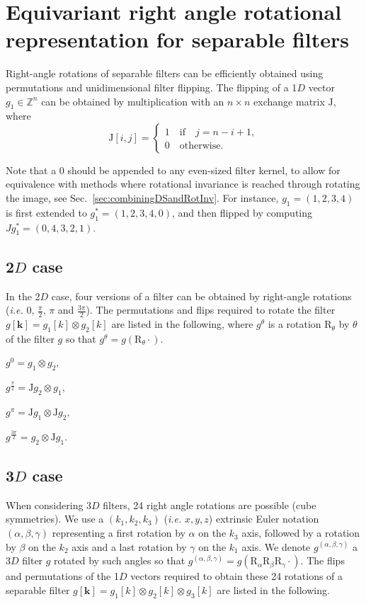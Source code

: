 \documentclass[fleqn,a4paper,oneside,openany]{book}
\begin{document}
\appendix
\chapter{Equivariant right angle rotational representation for separable filters} \label{app:separableConvRightAngleEquivariant}
Right-angle rotations of separable filters can be efficiently obtained using permutations and unidimensional filter flipping.
The flipping of a 1$D$ vector $g_1 \in \mathbb{Z}^n$ can be obtained by multiplication with an $n\times n$ exchange matrix $\mathrm{J}$, where 
$$\mathrm{J}[i,j] = \begin{cases}
1\quad \text{if}\quad j=n-i+1,\\
0\quad \text{otherwise}.
\end{cases}$$

Note that a $0$ should be appended to any even-sized filter kernel, to allow for equivalence with methods where rotational invariance is reached through rotating the image, see Sec.~\ref{sec:combiningDSandRotInv}. For instance, $g_1 = (1,2,3,4)$ is first extended to $g_1^{*}=(1,2,3,4,0)$, and then flipped by computing $Jg_1^{*}=(0,4,3,2,1)$.

\section{2$D$ case}
In the 2$D$ case, four versions of a filter can be obtained by right-angle rotations (\textit{i.e.} $0$, $\frac{\pi}{2}$, $\pi$ and $\frac{3\pi}{2}$). The permutations and flips required to rotate the filter $g[\boldsymbol{k}]= g_{1}[k]\otimes g_{2}[k]$ are listed in the following, where $g^{\theta}$ is a rotation $\mathrm{R}_{\theta}$ by $\theta$  of the filter $g$ so that $g^{\theta}=g(\mathrm{R}_{\theta}\cdot)$.

$g^0= g_{1}\otimes g_{2},$

$g^{\frac{\pi}{2}}= \mathrm{J} g_{2}\otimes g_{1},$

$g^{\pi}= \mathrm{J} g_{1}\otimes \mathrm{J} g_{2},$

$g^{\frac{3\pi}{2}}= g_{2}\otimes \mathrm{J} g_{1}.$


\section{3$D$ case}
When considering 3$D$ filters, 24 right angle rotations are possible (cube symmetries). 
We use a $(k_1,k_2,k_3)$ (\textit{i.e.} $x,y,z$) extrinsic Euler notation $(\alpha,\beta,\gamma)$ representing a first rotation by $\alpha$ on the $k_3$ axis, followed by a rotation by $\beta$ on the $k_2$ axis and a last rotation by $\gamma$ on the $k_1$ axis.
We denote $g^{(\alpha,\beta,\gamma)}$ a 3$D$ filter $g$ rotated by such angles so that $g^{(\alpha,\beta,\gamma)} = g(\mathrm{R}_{\alpha}\mathrm{R}_{\beta}\mathrm{R}_{\gamma}\cdot)$.
The flips and permutations of the 1$D$ vectors required to obtain these 24 rotations of a separable filter $g[\boldsymbol{k}]= g_{1}[k]\otimes g_{2}[k]\otimes g_{3}[k]$ are listed in the following.
\end{document}

